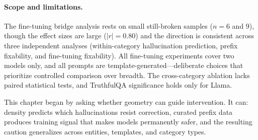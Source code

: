 \paragraph{Scope and limitations.} The fine-tuning bridge analysis rests on small still-broken samples ($n = 6$ and $9$), though the effect sizes are large ($|r| = 0.80$) and the direction is consistent across three independent analyses (within-category hallucination prediction, prefix fixability, and fine-tuning fixability). All fine-tuning experiments cover two models only, and all prompts are template-generated---deliberate choices that prioritize controlled comparison over breadth. The cross-category ablation lacks paired statistical tests, and TruthfulQA significance holds only for Llama.

This chapter began by asking whether geometry can guide intervention. It can: density predicts which hallucinations resist correction, curated prefix data produces training signal that makes models permanently safer, and the resulting caution generalizes across entities, templates, and category types. 
